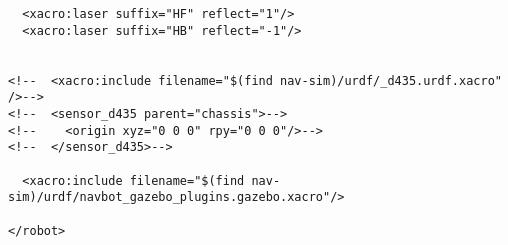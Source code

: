 \begin{verbatim}
  <xacro:laser suffix="HF" reflect="1"/>
  <xacro:laser suffix="HB" reflect="-1"/>


<!--  <xacro:include filename="$(find nav-sim)/urdf/_d435.urdf.xacro" />-->
<!--  <sensor_d435 parent="chassis">-->
<!--    <origin xyz="0 0 0" rpy="0 0 0"/>-->
<!--  </sensor_d435>-->

  <xacro:include filename="$(find nav-sim)/urdf/navbot_gazebo_plugins.gazebo.xacro"/>

</robot>

\end{verbatim}